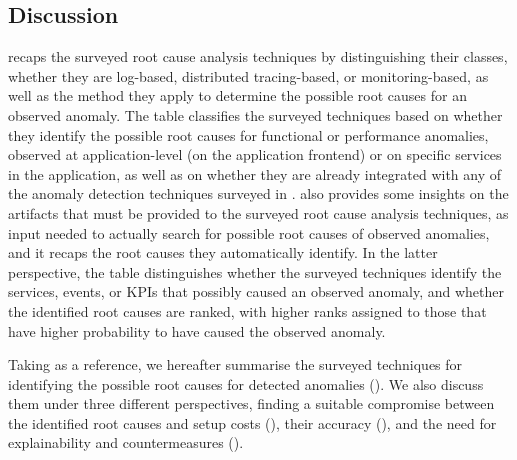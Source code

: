 \subsection{Discussion}
\label{sec:rca:discussion}
 recaps the surveyed root cause analysis techniques by distinguishing their classes, \viz whether they are log-based, distributed tracing-based, or monitoring-based, as well as the method they apply to determine the possible root causes for an observed anomaly.
The table classifies the surveyed techniques based on whether they identify the possible root causes for functional or performance anomalies, observed at application-level (\eg on the application frontend) or on specific services in the application, as well as on whether they are already integrated with any of the anomaly detection techniques surveyed in .
 also provides some insights on the artifacts that must be provided to the surveyed root cause analysis techniques, as input needed to actually search for possible root causes of observed anomalies, and it recaps the root causes they automatically identify.
In the latter perspective, the table distinguishes whether the surveyed techniques identify the services, events, or KPIs that possibly caused an observed anomaly, and whether the identified root causes are ranked, with higher ranks assigned to those that have higher probability to have caused the observed anomaly.

Taking  as a reference, we hereafter summarise the surveyed techniques for identifying the possible root causes for detected anomalies ().
We also discuss them under three different perspectives, \viz finding a suitable compromise between the identified root causes and setup costs (), their accuracy (), and the need for explainability and countermeasures (). %

